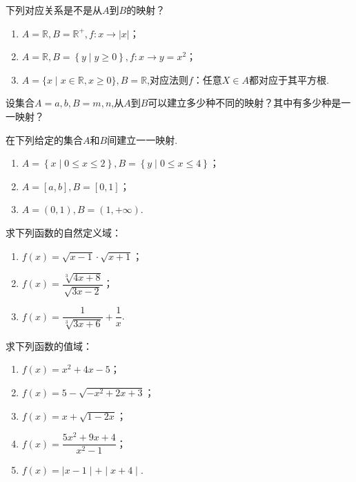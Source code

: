 \documentclass[lang=cn,math=cm,chinesefont=nofont,11pt,scheme=chinese,twocol]{elegantbook}
\begin{document}
\begin{exercise}\label{HS2FZ_lkb1_P34_exp.4,BJSZ_Algebra1_P40}
  下列对应关系是不是从$A$到$B$的映射？
\end{exercise}

\begin{enumerate}
  \item $A=\mathbb{R},B=\mathbb{R}^{+},f:x\rightarrow\left|x\right|$；
  \item $A=\mathbb{R},B=\left\{y\mid y\geqslant 0\right\},f:x\rightarrow y=x^2$；
  \item $A=\{x\mid x\in\mathbb{R},x\geqslant0\},B=\mathbb{R}$,对应法则$f$：任意$X\in A$都对应于其平方根.
\end{enumerate}

\begin{exercise}
  设集合$A={a,b},B={m,n}$,从$A$到$B$可以建立多少种不同的映射？其中有多少种是一一映射？
\end{exercise}

\begin{exercise}
  在下列给定的集合$A$和$B$间建立一一映射.
\end{exercise}

\begin{enumerate}
  \item $A=\left\{x\mid 0\leqslant x\leqslant 2\right\},B=\left\{y\mid 0\leqslant x\leqslant 4\right\}$；
  \item $A=[a,b],B=[0,1]$；
  \item $A=(0,1),B=(1,+\infty)$.
\end{enumerate}

\begin{exercise}
  求下列函数的自然定义域：
\end{exercise}

\begin{spacing}{1.8}
  \begin{enumerate}
  \item $f(x)=\sqrt{x-1}\cdot\sqrt{x+1}$；
  \item $f(x)=\dfrac{\sqrt[3]{4x+8}}{\sqrt{3x-2}}$；
  \item $f(x)=\dfrac1{\sqrt[3]{3x+6}}+\dfrac1x$.
  \end{enumerate}
\end{spacing}

\begin{exercise}
  求下列函数的值域：
\end{exercise}

\begin{spacing}{1.8}
\begin{enumerate}
  \item $f(x)=x^2+4x-5$；
  \item $f(x)=5-\sqrt{-x^{2}+2x+3}$；
  \item $f(x)=x+\sqrt{1-2x}$；
  \item $f(x)=\dfrac{5x^{2}+9x+4}{x^{2}-1}$；
  \item $f(x)=\mid x-1\mid+\mid x+4\mid $.
\end{enumerate}
\end{spacing}
\end{document}
